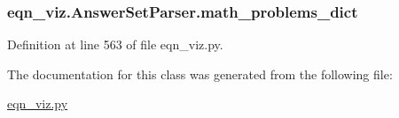 \subsubsection[{math\+\_\+problems\+\_\+dict}]{\setlength{\rightskip}{0pt plus 5cm}eqn\+\_\+viz.\+Answer\+Set\+Parser.\+math\+\_\+problems\+\_\+dict}\label{classeqn__viz_1_1_answer_set_parser_aaf05269f220f98b07c9456d89ddca538}


Definition at line 563 of file eqn\+\_\+viz.\+py.



The documentation for this class was generated from the following file\+:\begin{DoxyCompactItemize}
\item 
\hyperlink{eqn__viz_8py}{eqn\+\_\+viz.\+py}\end{DoxyCompactItemize}
